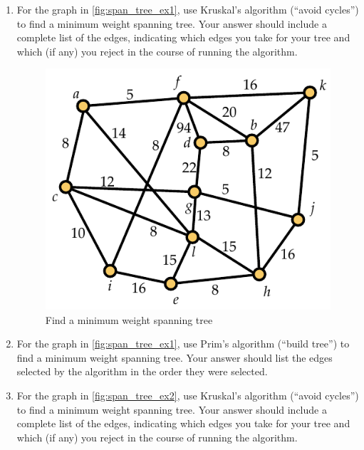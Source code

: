 \begin{enumerate}
\item For the graph in \autoref{fig:span_tree_ex1}, use Kruskal's
  algorithm (``avoid cycles'') to find a minimum weight spanning
  tree. Your answer should include a complete list of the edges,
  indicating which edges you take for your tree and which (if any) you
  reject in the course of running the algorithm.
  \begin{figure}[h]
    \centering
    \includegraphics[scale=0.65]{graphalgorithms-figs/span_tree_ex1}
    \caption{Find a minimum weight spanning tree}
    \label{fig:span_tree_ex1}
  \end{figure}
\item For the graph in \autoref{fig:span_tree_ex1}, use Prim's
  algorithm (``build tree'') to find a minimum weight spanning
  tree. Your answer should list the edges selected by the algorithm in
  the order they were selected.
\item For the graph in \autoref{fig:span_tree_ex2}, use Kruskal's
  algorithm (``avoid cycles'') to find a minimum weight spanning
  tree. Your answer should include a complete list of the edges,
  indicating which edges you take for your tree and which (if any) you
  reject in the course of running the algorithm.
  \begin{figure}[h]
    \centering

\end{figure}
\end{enumerate}
